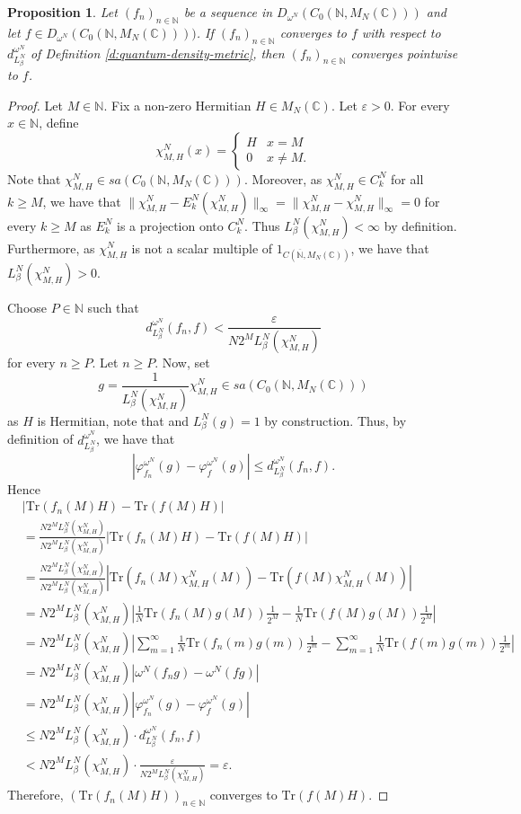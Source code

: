 \documentclass{amsart}
\theoremstyle{plain}
\newtheorem{proposition}[theorem]{Proposition}
\theoremstyle{definition}
\theoremstyle{remark}
\numberwithin{equation}{section}
\newcommand{\ee}{{\varepsilon}}
\newcommand{\be}{{\beta}}
\newcommand{\om}{{\omega}}
\newcommand{\vhi}{{\varphi}}
\newcommand{\N}{{\mathds{N}}}
\newcommand{\C}{{\mathds{C}}}
\renewcommand{\geq}{\geqslant}
\renewcommand{\leq}{\leqslant}
\begin{document}
\begin{proposition}\label{p:qm-pointwise}
    Let $(f_n)_{n\in \N}$ be a sequence in $D_{\om^N}(C_0(\N, M_N(\C)))$ and let $f\in D_{\om^N}(C_0(\N, M_N(\C))))$. If $(f_n)_{n\in \N}$ converges to $f$ with respect to $d_{L^N_\be}^{\om^N}$ of Definition \ref{d:quantum-density-metric}, then $(f_n)_{n\in \N}$ converges pointwise to $f$.
\end{proposition}
\begin{proof}
  Let $M\in \N$.  Fix a non-zero Hermitian $H\in M_N(\C)$. Let $\ee>0$. For every $x\in \N$, define
    \[
    \chi_{M,H}^N(x)=\begin{cases}
        H & x=M\\
        0 & x\neq M.
    \end{cases}
    \]Note that $\chi_{M,H}^N\in sa(C_0(\N, M_N(\C)))$. Moreover, as $\chi_{M,H}^N \in C_k^N$ for all $k \geq M$, we have that $\|\chi_{M,H}^N-E_k^N(\chi_{M,H}^N)\|_\infty=\|\chi_{M,H}^N-\chi_{M,H}^N\|_\infty=0$ for every $k \geq M$ as $E_k^N$ is a projection onto $C_k^N$. Thus $L_\be^N(\chi_{M,H}^N)<\infty$ by definition. Furthermore, as $\chi_{M,H}^N$ is not a scalar multiple of $1_{C(\overline{\N}, M_N(\C))}$, we have that $L_\be^N(\chi_{M,H}^N)>0$.
     
        Choose $P\in \N$ such that 
    \[
    d_{L_\be^N}^{\om^N}(f_n,f)< \frac{\ee}{N2^ML_\be^N (\chi_{M,H}^N)}
    \]
    for every $n \geq P$. Let $n \geq P$. Now, set 
    \[
    g=\frac{1}{L_\be^N(\chi_{M,H}^N)}\chi_{M,H}^N\in sa(C_0(\N, M_N(\C)))
    \]
    as $H$ is Hermitian, note that 
    and $L_\be^N(g)=1$ by construction. Thus, by definition of  $ d_{L^N_\be}^{\om^N}$, we have
that 
\[
 |\vhi^{\om^N}_{f_n}(g)-\vhi^{\om^N}_{f }(g)| \leq d_{L_\be^N}^{\om^N}(f_n,f).
\]
Hence
\begin{align*}
  &  |\mathrm{Tr}(f_n(M)H)-\mathrm{Tr}(f(M)H)|\\
    &=\frac{N2^ML_\be^N (\chi_{M,H}^N)}{N2^ML^N_\be (\chi_{M,H}^N)}|\mathrm{Tr}(f_n(M)H)-\mathrm{Tr}(f(M)H)|\\
    & = \frac{N2^ML_\be^N (\chi_{M,H}^N)}{N2^ML^N_\be (\chi_{M,H}^N)}|\mathrm{Tr}(f_n(M)\chi_{M,H}^N(M))-\mathrm{Tr}(f(M)\chi_{M,H}^N(M))|\\
    & = N2^ML_\be^N (\chi_{M,H}^N)\left|\frac{1}{N}\mathrm{Tr}(f_n(M)g(M))\frac{1}{2^M}-\frac{1}{N}\mathrm{Tr}(f(M)g(M))\frac{1}{2^M}\right|\\
    & =  N2^ML_\be^N (\chi_{M,H}^N)\left| \sum_{m=1}^\infty \frac{1}{N}\mathrm{Tr}(f_n(m)g(m))\frac{1}{2^m}-\sum_{m=1}^\infty \frac{1}{N}\mathrm{Tr}(f(m)g(m))\frac{1}{2^m}\right|\\
    & =N2^ML_\be^N (\chi_{M,H}^N)\left| \om^N(f_ng)-\om^N(fg)\right|\\
    & = N2^ML_\be^N (\chi_{M,H}^N)|\vhi^{\om^N}_{f_n}(g)-\vhi^{\om^N}_{f }(g)|\\
    & \leq  N2^ML_\be^N (\chi_{M,H}^N)\cdot d_{L_\be^N}^{\om^N}(f_n,f)\\
    & < N2^ML_\be^N (\chi_{M,H}^N) \cdot \frac{\ee}{N2^ML_\be^N (\chi_{M,H}^N)}=\ee.
\end{align*}
   Therefore, $(\mathrm{Tr}(f_n(M)H))_{n\in \N}$ converges to $\mathrm{Tr}(f(M)H)$. 
   

\end{proof}
\end{document}
